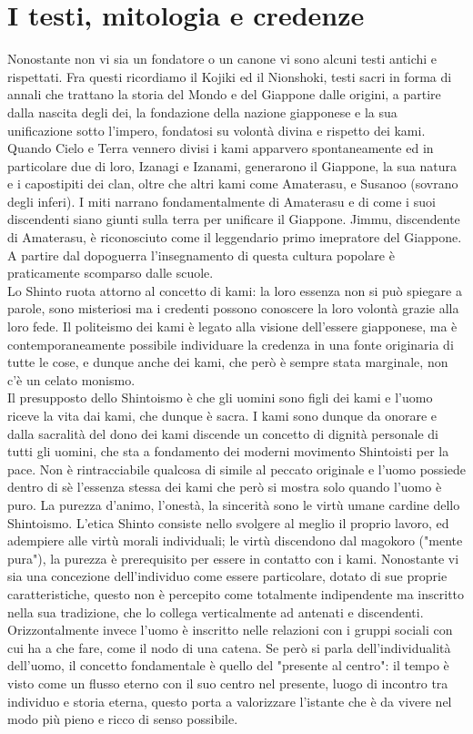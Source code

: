 \documentclass[10pt,a4paper]{report}
\begin{document}
\section{I testi, mitologia e credenze}
Nonostante non vi sia un fondatore o un canone vi sono alcuni testi antichi e rispettati. Fra questi ricordiamo il Kojiki ed il Nionshoki, testi sacri in forma di annali che trattano la storia del Mondo e del Giappone dalle origini, a partire dalla nascita degli dei, la fondazione della nazione giapponese e la sua unificazione sotto l'impero, fondatosi su volontà divina e rispetto dei kami. Quando Cielo e Terra vennero divisi i kami apparvero spontaneamente ed in particolare due di loro, Izanagi e Izanami,  generarono il Giappone, la sua natura e i capostipiti dei clan, oltre che altri kami come Amaterasu, e Susanoo (sovrano degli inferi).  I miti narrano fondamentalmente di Amaterasu e di come i suoi discendenti siano giunti sulla terra per unificare il Giappone. Jimmu, discendente di Amaterasu, è riconosciuto come il leggendario primo imepratore del Giappone. A partire dal dopoguerra l'insegnamento di questa cultura popolare è praticamente scomparso dalle scuole.\\
Lo Shinto ruota attorno al concetto di kami: la loro essenza non si può spiegare a parole, sono misteriosi ma i credenti possono conoscere la loro volontà grazie alla loro fede. Il politeismo dei kami è legato alla visione dell'essere giapponese, ma è contemporaneamente possibile individuare la credenza in una fonte originaria di tutte le cose, e dunque anche dei kami, che però è sempre stata marginale, non c'è un celato monismo.\\
Il presupposto dello Shintoismo è che gli uomini sono figli dei kami e l'uomo riceve la vita dai kami, che dunque è sacra. I kami sono dunque da onorare e dalla sacralità del dono dei kami discende un concetto di dignità personale di tutti gli uomini, che sta a fondamento dei moderni movimento Shintoisti per la pace. Non è rintracciabile qualcosa di simile al peccato originale e l'uomo possiede dentro di sè l'essenza stessa dei kami che però si mostra solo quando l'uomo è puro. La purezza d'animo, l'onestà, la sincerità sono le virtù umane cardine dello Shintoismo. L'etica Shinto consiste nello svolgere al meglio il proprio lavoro, ed adempiere alle virtù morali individuali; le virtù discendono dal magokoro ("mente pura"), la purezza è prerequisito per essere in contatto con i kami. Nonostante vi sia una concezione dell'individuo come essere particolare, dotato di sue proprie caratteristiche, questo non è percepito come totalmente indipendente ma inscritto nella sua tradizione, che lo collega verticalmente ad antenati e discendenti. Orizzontalmente invece l'uomo è inscritto nelle relazioni con i gruppi sociali con cui ha a che fare, come il nodo di una catena. Se però si parla dell'individualità dell'uomo, il concetto fondamentale è quello del "presente al centro": il tempo è visto come un flusso eterno con il suo centro nel presente, luogo di incontro tra individuo e storia eterna, questo porta a valorizzare l'istante che è da vivere nel modo più pieno e ricco di senso possibile. 
\end{document}
